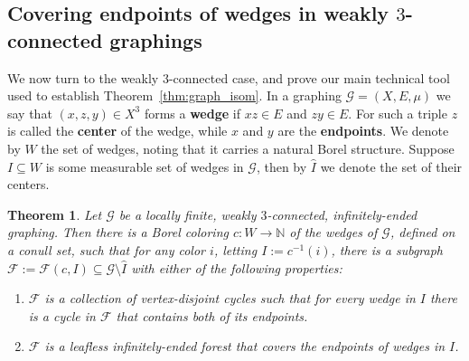 \documentclass{article}
\theoremstyle{plain}
\newtheorem{thm}{Theorem}[section]
\theoremstyle{definition}
\newcommand{\N}{\mathbb{N}}
\newcommand{\cG}{\mathcal{G}}
\newcommand{\cF}{\mathcal{F}}
\begin{document}
\subsection{Covering endpoints of wedges in weakly $3$-connected graphings}

We now turn to the weakly $3$-connected case, and prove our main technical tool used to establish Theorem~\ref{thm:graph_isom}. In a graphing $\cG =(X,E,\mu)$ we say that $(x,z,y)\in X^3$ forms a \textbf{wedge} if $xz\in E$ and $zy \in E$. For such a triple $z$ is called the \textbf{center} of the wedge, while $x$ and $y$ are the \textbf{endpoints}. We denote by $W$ the set of wedges, noting that it carries a natural Borel structure. Suppose $I \subseteq W$ is some measurable set of wedges in $\cG$, then by $\widehat{I}$ we denote the set of their centers. 


\begin{thm}\label{thm:cycle_or_forest}
        Let $\cG$ be a locally finite, weakly $3$-connected, infinitely-ended graphing. Then there is a Borel coloring $c:W\to\N$ of the wedges of $\cG$, defined on a conull set, such that for any color $i$, letting $I:=c^{-1}(i)$, there is a subgraph $\cF:=\cF(c,I)\subseteq \cG\setminus{\widehat{I}}$ with either of the following properties:
        \begin{enumerate}
            \item\label{thm:cycle} $\cF$ is a collection of vertex-disjoint cycles such that  for every wedge in $I$ there is a cycle in $\cF$ that contains both of its endpoints. %
            \item\label{thm:forest} $\cF$ is a leafless infinitely-ended forest that covers the endpoints of wedges in $I$.
        \end{enumerate}
\end{thm}
\end{document}
